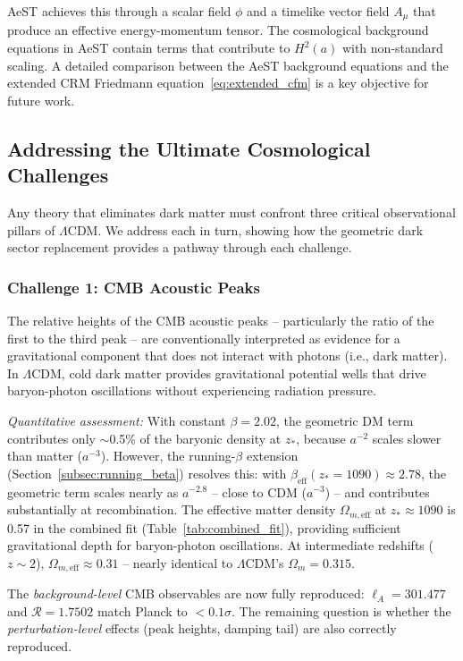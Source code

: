 \documentclass[aps,prd,twocolumn,superscriptaddress,nofootinbib]{revtex4-2}
\begin{document}
AeST achieves this through a scalar field $\phi$ and a timelike vector field $A_\mu$ that produce an effective energy-momentum tensor. The cosmological background equations in AeST contain terms that contribute to $H^2(a)$ with non-standard scaling. A detailed comparison between the AeST background equations and the extended CRM Friedmann equation~\eqref{eq:extended_cfm} is a key objective for future work.

\subsection{Addressing the Ultimate Cosmological Challenges}
\label{subsec:endgegner}

Any theory that eliminates dark matter must confront three critical observational pillars of $\Lambda$CDM. We address each in turn, showing how the geometric dark sector replacement provides a pathway through each challenge.

\subsubsection{Challenge 1: CMB Acoustic Peaks}

The relative heights of the CMB acoustic peaks -- particularly the ratio of the first to the third peak -- are conventionally interpreted as evidence for a gravitational component that does not interact with photons (i.e., dark matter). In $\Lambda$CDM, cold dark matter provides gravitational potential wells that drive baryon-photon oscillations without experiencing radiation pressure.

\textit{Quantitative assessment:} With constant $\beta = 2.02$, the geometric DM term contributes only $\sim$0.5\% of the baryonic density at $z_*$, because $a^{-2}$ scales slower than matter ($a^{-3}$). However, the running-$\beta$ extension (Section~\ref{subsec:running_beta}) resolves this: with $\beta_{\mathrm{eff}}(z_* = 1090) \approx 2.78$, the geometric term scales nearly as $a^{-2.8}$ -- close to CDM ($a^{-3}$) -- and contributes substantially at recombination. The effective matter density $\Omega_{m,\mathrm{eff}}$ at $z_* \approx 1090$ is 0.57 in the combined fit (Table~\ref{tab:combined_fit}), providing sufficient gravitational depth for baryon-photon oscillations. At intermediate redshifts ($z \sim 2$), $\Omega_{m,\mathrm{eff}} \approx 0.31$ -- nearly identical to $\Lambda$CDM's $\Omega_m = 0.315$.

The \textit{background-level} CMB observables are now fully reproduced: $\ell_A = 301.477$ and $\mathcal{R} = 1.7502$ match Planck to $<0.1\sigma$. The remaining question is whether the \textit{perturbation-level} effects (peak heights, damping tail) are also correctly reproduced.
\end{document}
